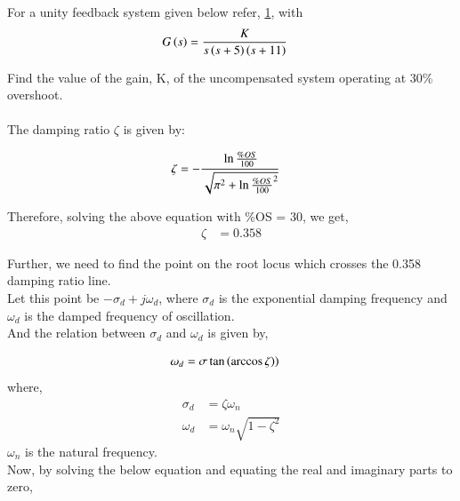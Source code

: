 
\item For a unity feedback system given below refer, \ref{fig:ep18btech11016_block}, with
\begin{align}
    G\left(s\right) &= \frac{K}{s\left(s+5\right)\left(s+11\right)}
    \label{eq:ep18btech11016_system}
\end{align}

\begin{figure}[h]
 \centering
    \resizebox{\columnwidth}{!}{}
    \caption{}
    \label{fig:ep18btech11016_block}
\end{figure}

Find the value of the gain, K, of the uncompensated system operating at 30\% overshoot.\\

\solution\\ The damping ratio $\zeta$ is given by:

\begin{align}
    \zeta &= -\cfrac{\ln{\frac{\%OS}{100}}}{\sqrt{\pi^2 + \ln{\frac{\%OS}{100}}^2}}
    \label{eq:ep18btech11016_zeta}
\end{align}

Therefore, solving the above equation with \%OS = 30, we get,
\begin{align}
    \zeta &= 0.358
\end{align}

Further, we need to find the point on the root locus which crosses the 0.358 damping ratio line.\\
Let this point be $-\sigma_d + j\omega_d$, where $\sigma_d$ is the exponential damping frequency and $\omega_d$ is the damped frequency of oscillation.\\
And the relation between $\sigma_d$ and $\omega_d$ is given by,

\begin{align}
    \omega_d &= \sigma\tan\left(\arccos{\zeta})\right)
\end{align}
where, 
\begin{align}
    \sigma_d &= \zeta\omega_n\\
    \omega_d &= \omega_n\sqrt{1-\zeta^2}
\end{align}
$\omega_n$ is the natural frequency.\\

Now, by solving the below equation and equating the real and imaginary parts to zero,

